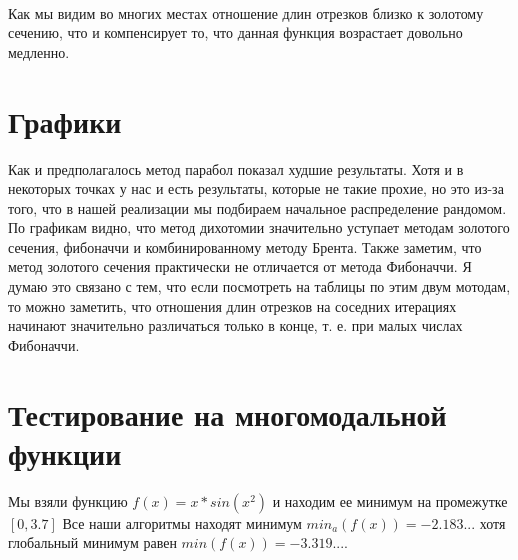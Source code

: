 
\ 

Как мы видим во многих местах отношение длин отрезков
близко к золотому сечению, что и компенсирует то, что данная
функция возрастает довольно медленно.


\section {Графики}



Как и предполагалось метод парабол показал худшие результаты.
Хотя и в некоторых точках у нас и есть результаты, которые
не такие прохие, но это из-за того, что в нашей реализации
мы подбираем начальное распределение рандомом.
По графикам видно, что метод дихотомии значительно уступает
методам золотого сечения, фибоначчи и комбинированному методу Брента.
Также заметим, что метод золотого сечения практически не отличается от метода
Фибоначчи. Я думаю это связано с тем, что если посмотреть на таблицы
по этим двум мотодам, то можно заметить, что отношения
длин отрезков на соседних итерациях начинают значительно различаться
только в конце, т. е. при малых числах Фибоначчи.

\newpage
\section {Тестирование на многомодальной функции}
Мы взяли функцию 
$f(x) = x * sin(x^2)$
и находим ее минимум на промежутке $[0, 3.7]$
Все наши алгоритмы находят минимум $min_a (f(x)) = -2.183...$
хотя глобальный минимум равен $min(f(x)) = -3.319...$.

